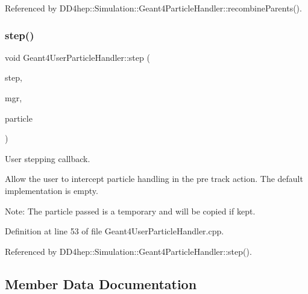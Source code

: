 Referenced by D\+D4hep\+::\+Simulation\+::\+Geant4\+Particle\+Handler\+::recombine\+Parents().

\hypertarget{class_d_d4hep_1_1_simulation_1_1_geant4_user_particle_handler_ac6a981e18ee2fa776907fda60aa54bb6}{}\label{class_d_d4hep_1_1_simulation_1_1_geant4_user_particle_handler_ac6a981e18ee2fa776907fda60aa54bb6} 
\subsubsection{\texorpdfstring{step()}{step()}}
{\footnotesize\ttfamily void Geant4\+User\+Particle\+Handler\+::step (\begin{DoxyParamCaption}\item[{const G4\+Step $\ast$}]{step,  }\item[{G4\+Stepping\+Manager $\ast$}]{mgr,  }\item[{\hyperlink{class_d_d4hep_1_1_simulation_1_1_geant4_user_particle_handler_a0222f326d539ff27c6c446a7a30e8e26}{Particle} \&}]{particle }\end{DoxyParamCaption})\hspace{0.3cm}{\ttfamily [virtual]}}



User stepping callback. 

Allow the user to intercept particle handling in the pre track action. The default implementation is empty.

Note\+: The particle passed is a temporary and will be copied if kept. 

Definition at line 53 of file Geant4\+User\+Particle\+Handler.\+cpp.



Referenced by D\+D4hep\+::\+Simulation\+::\+Geant4\+Particle\+Handler\+::step().



\subsection{Member Data Documentation}
\hypertarget{class_d_d4hep_1_1_simulation_1_1_geant4_user_particle_handler_aaa82abebed535571499c3fa436f86a1b}{}\label{class_d_d4hep_1_1_simulation_1_1_geant4_user_particle_handler_aaa82abebed535571499c3fa436f86a1b} 
